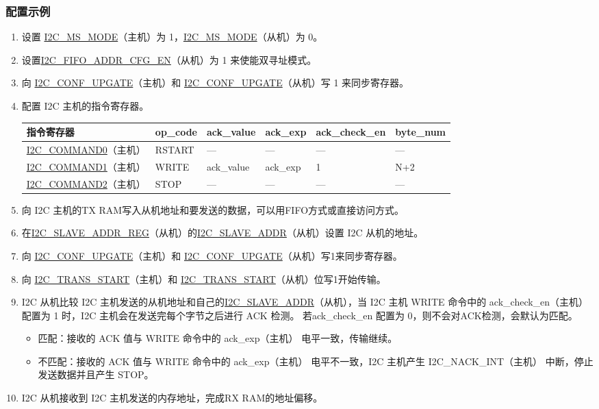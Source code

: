 \documentclass[main\_\_CN.tex]{subfiles}
\begin{document}
\subsubsection{配置示例}
\begin{enumerate}
\item 设置 \hyperref[fielddesc:I2CMSMODE]{I2C\_MS\_MODE}（主机）为 1，\hyperref[fielddesc:I2CMSMODE]{I2C\_MS\_MODE}（从机）为 0。
\item 设置\hyperref[fielddesc:I2CFIFOADDRCFGEN]{I2C\_FIFO\_ADDR\_CFG\_EN}（从机）为 1 来使能双寻址模式。
\item 向 \hyperref[fielddesc:I2CCONFUPGATE]{I2C\_CONF\_UPGATE}（主机）和 \hyperref[fielddesc:I2CCONFUPGATE]{I2C\_CONF\_UPGATE}（从机）写 1 来同步寄存器。
\item 配置 I2C 主机的指令寄存器。
\begin{longtable}{ | p{4cm} | p{2cm} | p{2cm} | p{2cm} |p{2cm} | p{2cm} |}
\hline\rowcolor{lightgray}
指令寄存器& op\_code & ack\_value&ack\_exp&ack\_check\_en&byte\_num  \\ \hline
\hyperref[fielddesc:I2CCOMMAND0]{I2C\_COMMAND0}（主机）& RSTART& ---&---&---&---  \\ \hline
\hyperref[fielddesc:I2CCOMMAND1]{I2C\_COMMAND1}（主机）& WRITE& ack\_value&ack\_exp&1&N+2  \\ \hline
\hyperref[fielddesc:I2CCOMMAND2]{I2C\_COMMAND2}（主机）& STOP& ---&---&---&---  \\ \hline
\end{longtable}
\item 向 I2C 主机的TX RAM写入从机地址和要发送的数据，可以用FIFO方式或直接访问方式。
\item 在\hyperref[regdesc:I2CSLAVEADDRREG]{I2C\_SLAVE\_ADDR\_REG}（从机）的\hyperref[fielddesc:I2CSLAVEADDR]{I2C\_SLAVE\_ADDR}（从机）设置 I2C 从机的地址。
\item 向 \hyperref[fielddesc:I2CCONFUPGATE]{I2C\_CONF\_UPGATE}（主机）和 \hyperref[fielddesc:I2CCONFUPGATE]{I2C\_CONF\_UPGATE}（从机）写1来同步寄存器。
\item 向 \hyperref[fielddesc:I2CTRANSSTART]{I2C\_TRANS\_START}（主机）和 \hyperref[fielddesc:I2CTRANSSTART]{I2C\_TRANS\_START}（从机）位写1开始传输。
\item I2C 从机比较 I2C 主机发送的从机地址和自己的\hyperref[fielddesc:I2CSLAVEADDR]{I2C\_SLAVE\_ADDR}（从机），当 I2C 主机 WRITE 命令中的 ack\_check\_en（主机） 配置为 1 时，I2C 主机会在发送完每个字节之后进行 ACK 检测。 若ack\_check\_en 配置为 0，则不会对ACK检测，会默认为匹配。
\begin{itemize}
\item 匹配：接收的 ACK 值与 WRITE 命令中的 ack\_exp（主机） 电平一致，传输继续。
\item 不匹配：接收的 ACK 值与 WRITE 命令中的 ack\_exp（主机） 电平不一致，I2C 主机产生 I2C\_NACK\_INT（主机） 中断，停止发送数据并且产生 STOP。
\end{itemize}
\item I2C 从机接收到 I2C 主机发送的内存地址，完成RX RAM的地址偏移。


\end{enumerate}
\end{document}

